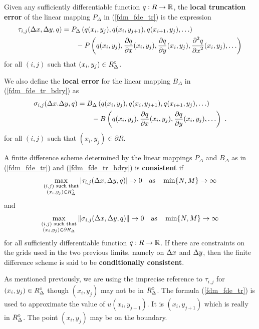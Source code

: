 \begin{defn}\label{fdm_consist_def}
Given any sufficiently differentiable function $q:R \to \mathbb{R}$, the
{\bfseries local truncation error} of the linear mapping $P_\Delta$ in
(\ref{fdm_fde_tr}) is the expression
\begin{align*}
\tau_{i,j}(\Delta{x},\Delta{y},q)
&= P_\Delta\left(q(x_i,y_j), q(x_i,y_{j+1}), q(x_{i+1},y_j), \ldots\right) \\
&\qquad - P\left(q(x_i,y_j), \frac{\partial{q}}{\partial{x}}(x_i,y_j), \frac{\partial{q}}{\partial{y}}(x_i,y_j),
\frac{\displaystyle \partial^{2}{q}} {\displaystyle \partial{x}^{2}}(x_i,y_j), \ldots \right)
\end{align*}
for all $(i,j)$ such that $\displaystyle (x_i,y_j) \in R^\circ_\Delta$.

We also define the {\bfseries local error} for the linear mapping
$B_\Delta$ in (\ref{fdm_fde_tr_bdry}) as
\begin{align*}
\sigma_{i,j}(\Delta{x}.\Delta{y},q)
&= B_\Delta\left(q(x_i,y_j), q(x_i,y_{j+1}), q(x_{i+1},y_j),
\ldots\right) \\
&\qquad - B\left(q(x_i,y_j), \frac{\partial{q}}{\partial{x}}(x_i,y_j), \frac{\partial{q}}{\partial{y}}(x_i,y_j),
\ldots \right) \ .
\end{align*}
for all $(i,j)$ such that $(x_i,y_j) \in \partial R$.

A finite difference scheme determined by the linear mappings
$P_\Delta$ and $B_\Delta$ as in (\ref{fdm_fde_tr}) and
(\ref{fdm_fde_tr_bdry}) is
{\bfseries consistent} if
\[
\max_{\substack{(i,j) \text{ such that}\\(x_i,y_j) \in R^\circ_\Delta}}
|\tau_{i,j}(\Delta{x},\Delta{y},q)| \rightarrow 0 \quad \text{as} \quad
\min \{N, M\} \rightarrow \infty
\]
and
\[
\max_{\substack{(i,j) \text{ such that}\\(x_i,y_j) \in \partial R_\Delta}}
\|\sigma_{i,j}(\Delta{x},\Delta{y},q)\| \rightarrow 0 \quad \text{as} \quad
\min \{N, M\} \rightarrow \infty
\]
for all sufficiently differentiable function $q:R \to \mathbb{R}$.
If there are constraints on the grids used in the two previous limits,
namely on $\Delta{x}$ and $\Delta{y}$, then the finite difference scheme
is said to be {\bfseries conditionally consistent}.
\end{defn}

As mentioned previously, we are using the imprecise reference to
$\tau_{i,j}$ for $\displaystyle (x_i,y_j) \in R^\circ_\Delta$ though
$(x_i,y_j)$ may not be in $\displaystyle R^\circ_\Delta$.  The formula
(\ref{fdm_fde_tr}) is used to approximate the value of
$u(x_i,y_{j+1})$.  It is $(x_i,y_{j+1})$ which is really in
$\displaystyle R^\circ_\Delta$.   The point $(x_i,y_j)$ may be on the boundary.

